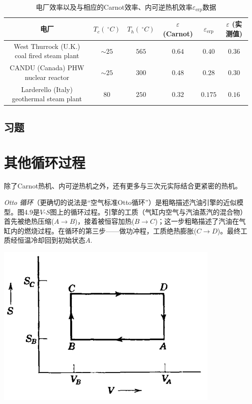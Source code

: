 \begin{table}[h]

\caption{电厂效率以及与相应的Carnot效率、内可逆热机效率$\varepsilon_{\text{erp}}$数据}
\begin{tabular}{c c c c c c}
\toprule
\textbf{电厂} & $T_c (\ ^\circ C)$ & $T_h (\ ^\circ C)$ & $\varepsilon$ (Carnot) & $\varepsilon_{\text{erp}}$ & $\varepsilon$ (实测值) \\
\midrule
West Thurrock  (U.K.)  coal fired steam plant & $\sim 25$ & $565$ & $0.64$ & $0.40$ & 0.36 \\
CANDU (Canada) PHW nuclear reactor & $\sim 25$ & $300$ & $0.48$ & $0.28$ & $0.30$ \\
Larderello (Italy) geothermal steam plant & $80$ & $250$ & $0.32$ & $0.175$ & $0.16$ \\
\bottomrule
\end{tabular}
\end{table}

\subsection*{习题}

\section{其他循环过程}
\label{sec4.10}
除了Carnot热机、内可逆热机之外，还有更多与三次元实际结合更紧密的热机。

{\it Otto 循环}（更确切的说法是“空气标准Otto循环”）是粗略描述汽油引擎的近似模型。图4.9是$V\text{-}S$图上的循环过程。引擎的工质（气缸内空气与汽油蒸汽的混合物）首先被绝热压缩($A \rightarrow B$)，接着被恒容加热($B \rightarrow C$)；这一步粗略描述了汽油在气缸内的燃烧过程。在循环的第三步——做功冲程，工质绝热膨胀($C \rightarrow D$)。最终工质经恒温冷却回到初始状态$A$.

{
	\centering
	\includegraphics[scale=0.7]{Pictures/fig4.9.png}
}

